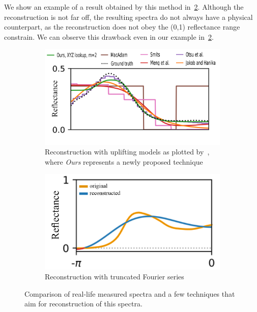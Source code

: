 We show an example of a result obtained by this method in~\cref{fig:specRecTruncatedFourier}. Although the reconstruction is not far off, the resulting spectra do not always have a physical counterpart, as the reconstruction does not obey the (0,1) reflectance range constrain. We can observe this drawback even in our example in~\cref{fig:specRecTruncatedFourier}.

\begin{figure}[t]
	\centering
	\begin{subfigure}[t]{0.45\textwidth}
		\includegraphics[width=\linewidth]{img/spectra_rec_method_comparison.png}
		\caption{Reconstruction with uplifting models as plotted by~\citet{trigonometricMomentsPaper}, where \emph{Ours} represents a newly proposed technique}
		\label{fig:specRecUpliftingMethods}
	\end{subfigure} \hspace{0.1em}
	\begin{subfigure}[t]{0.45\textwidth}
		\includegraphics[width=\linewidth]{img/spectra_rec_truncated_fourier.png}
		\caption{Reconstruction with truncated Fourier series~\cite{trigonometricMomentsPresentation}}
		\label{fig:specRecTruncatedFourier}
	\end{subfigure}
	\caption{Comparison of real-life measured spectra and a few techniques that aim for reconstruction of this spectra.}
	\label{fig:spectraReconstruction}
\end{figure}

